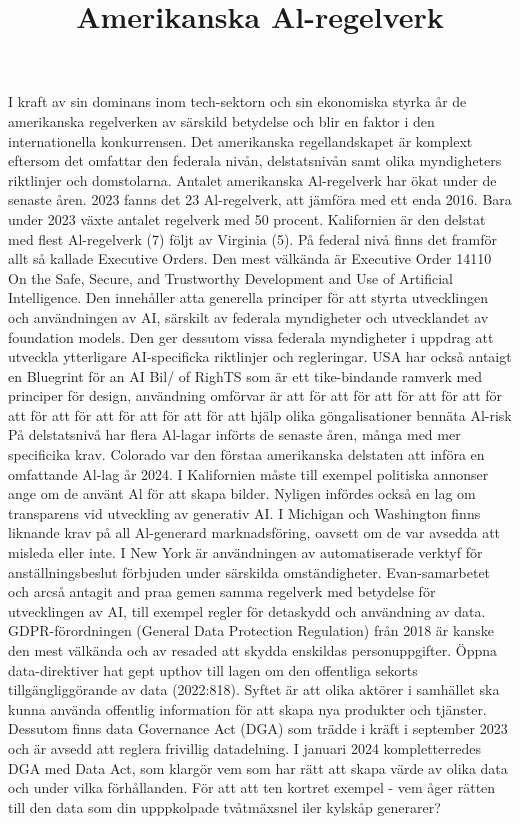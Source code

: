{{{{{\title{
Amerikanska Al-regelverk
}
I kraft av sin dominans inom tech-sektorn och sin ekonomiska styrka år de amerikanska regelverken av särskild betydelse och blir en faktor i den internationella konkurrensen. Det amerikanska regellandskapet är komplext eftersom det omfattar den federala nivån, delstatsnivån samt olika myndigheters riktlinjer och domstolarna.
Antalet amerikanska Al-regelverk har ökat under de senaste åren. 2023 fanns det 23 Al-regelverk, att jämföra med ett enda 2016. Bara under 2023 växte antalet regelverk med 50 procent. Kalifornien är den delstat med flest Al-regelverk (7) följt av Virginia (5).
På federal nivå finns det framför allt så kallade Executive Orders. Den mest välkända är Executive Order 14110 On the Safe, Secure, and Trustworthy Development and Use of Artificial Intelligence. Den innehåller atta generella principer för att styrta utvecklingen och användningen av AI, särskilt av federala myndigheter och utvecklandet av foundation models. Den ger dessutom vissa federala myndigheter i uppdrag att utveckla ytterligare AI-specificka riktlinjer och regleringar. USA har också antaigt en Bluegrint för an AI Bil/ of RighTS som är ett tike-bindande ramverk med principer för design, användning omförvar är att för att för att för att för att för att för att för att för att för att för att hjälp olika
göngalisationer bennäta Al-risk
På delstatsnivå har flera Al-lagar införts de senaste åren, många med mer specificika krav. Colorado var den förstaa amerikanska delstaten att införa en omfattande Al-lag år 2024. I Kalifornien måste till exempel politiska annonser ange om de använt Al för att skapa bilder. Nyligen infördes också en lag om transparens vid utveckling av generativ AI. I Michigan och Washington finns liknande krav på all Al-generard marknadsföring, oavsett om de var avsedda att misleda eller inte. I New York är användningen av automatiserade verktyf för anställningsbeslut förbjuden under särskilda omständigheter.
Evan-samarbetet och arcså antagit and praa gemen samma regelverk med betydelse för utvecklingen av AI, till exempel regler för detaskydd och användning av data. GDPR-förordningen (General Data Protection Regulation) från 2018 är kanske den mest välkända och av resaded att skydda enskildas personuppgifter. Öppna data-direktiver hat gept upthov till lagen om den offentliga sekorts tillgängliggörande av data (2022:818). Syftet är att olika aktörer i samhället ska kunna använda offentlig information för att skapa nya produkter och tjänster. Dessutom finns data Governance Act (DGA) som trädde i kräft i september 2023 och är avsedd att reglera frivillig datadelning. I januari 2024 kompletterredes DGA med Data Act, som klargör vem som har rätt att skapa värde av olika data och under vilka förhållanden. För att att ten kortret exempel - vem åger rätten till den data som din upppkolpade tvåtmäxsnel iler kylskåp generarer?
}}}}}
